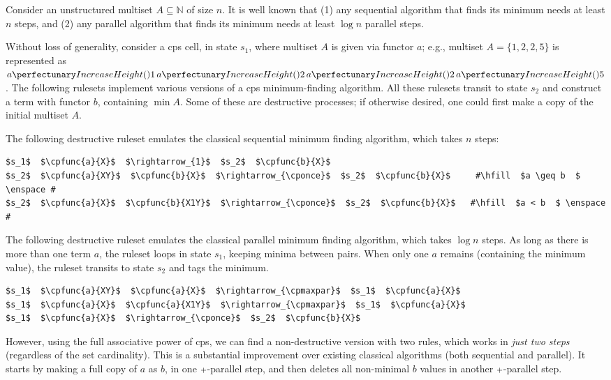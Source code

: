 Consider an unstructured multiset $A \subseteq \mathbb{N}$ of size \(n\). 
It is well known that (1) any sequential algorithm that finds its minimum needs at least \(n\) steps, and 
(2) any parallel algorithm that finds its minimum needs at least \(\log n\) parallel steps.

Without loss of generality, consider a \gls{cps} cell, in state \(s_1\), where multiset \(A\) is given via functor \(a\); 
e.g., multiset \(A = \{ 1, 2, 2, 5 \}\) is represented as \(\cpfunc{a}{1} \, \cpfunc{a}{2} \, \cpfunc{a}{2} \, \cpfunc{a}{5}\).
The following \glspl{ruleset} implement various versions of a \gls{cps} minimum-finding algorithm.
All these \glspl{ruleset} transit to state \(s_2\) and construct a term with functor \(b\), containing \(\mathop{min} A\).
Some of these are destructive processes; if otherwise desired, one could first make a copy of the initial multiset \(A\).

The following destructive \gls{ruleset} emulates the classical sequential minimum finding algorithm, which takes \(n\) steps:

\lstset{xleftmargin=.5in, xrightmargin=.5in} 
\begin{lstlisting}
$s_1$  $\cpfunc{a}{X}$  $\rightarrow_{1}$  $s_2$  $\cpfunc{b}{X}$ 
$s_2$  $\cpfunc{a}{XY}$  $\cpfunc{b}{X}$  $\rightarrow_{\cponce}$  $s_2$  $\cpfunc{b}{X}$     #\hfill  $a \geq b  $ \enspace #
$s_2$  $\cpfunc{a}{X}$  $\cpfunc{b}{X1Y}$  $\rightarrow_{\cponce}$  $s_2$  $\cpfunc{b}{X}$   #\hfill  $a < b  $ \enspace #
\end{lstlisting}

The following destructive \gls{ruleset} emulates the classical parallel minimum finding algorithm, which takes \(\log n\) steps.
As long as there is more than one term \(a\), the \gls{ruleset} loops in state \(s_1\), keeping minima between pairs.
When only one \(a\) remains (containing the minimum value), the \gls{ruleset} transits to state \(s_2\) and tags the minimum. 

\lstset{xleftmargin=.5in, xrightmargin=.5in} 
\begin{lstlisting}
$s_1$  $\cpfunc{a}{XY}$  $\cpfunc{a}{X}$  $\rightarrow_{\cpmaxpar}$  $s_1$  $\cpfunc{a}{X}$     
$s_1$  $\cpfunc{a}{X}$  $\cpfunc{a}{X1Y}$  $\rightarrow_{\cpmaxpar}$  $s_1$  $\cpfunc{a}{X}$
$s_1$  $\cpfunc{a}{X}$  $\rightarrow_{\cponce}$  $s_2$  $\cpfunc{b}{X}$  
\end{lstlisting}

However, using the full associative power of \gls{cps}, we can find a non-destructive version with two rules, 
which works in \emph{just two steps} (regardless of the set cardinality). 
This is a substantial improvement over existing classical algorithms (both sequential and parallel). 
It starts by making a full copy of \(a\) as \(b\), in one \({\scriptstyle +}\)-parallel step, 
and then deletes all non-minimal \(b\) values in another \({\scriptstyle +}\)-parallel step. 

